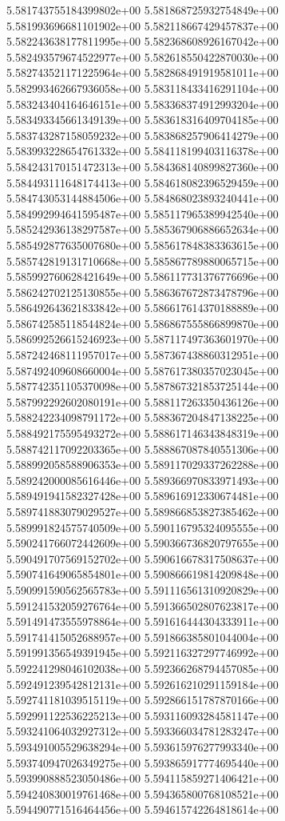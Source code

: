 5.581743755184399802e+00
5.581868725932754849e+00
5.581993696681101902e+00
5.582118667429457837e+00
5.582243638177811995e+00
5.582368608926167042e+00
5.582493579674522977e+00
5.582618550422870030e+00
5.582743521171225964e+00
5.582868491919581011e+00
5.582993462667936058e+00
5.583118433416291104e+00
5.583243404164646151e+00
5.583368374912993204e+00
5.583493345661349139e+00
5.583618316409704185e+00
5.583743287158059232e+00
5.583868257906414279e+00
5.583993228654761332e+00
5.584118199403116378e+00
5.584243170151472313e+00
5.584368140899827360e+00
5.584493111648174413e+00
5.584618082396529459e+00
5.584743053144884506e+00
5.584868023893240441e+00
5.584992994641595487e+00
5.585117965389942540e+00
5.585242936138297587e+00
5.585367906886652634e+00
5.585492877635007680e+00
5.585617848383363615e+00
5.585742819131710668e+00
5.585867789880065715e+00
5.585992760628421649e+00
5.586117731376776696e+00
5.586242702125130855e+00
5.586367672873478796e+00
5.586492643621833842e+00
5.586617614370188889e+00
5.586742585118544824e+00
5.586867555866899870e+00
5.586992526615246923e+00
5.587117497363601970e+00
5.587242468111957017e+00
5.587367438860312951e+00
5.587492409608660004e+00
5.587617380357023045e+00
5.587742351105370098e+00
5.587867321853725144e+00
5.587992292602080191e+00
5.588117263350436126e+00
5.588242234098791172e+00
5.588367204847138225e+00
5.588492175595493272e+00
5.588617146343848319e+00
5.588742117092203365e+00
5.588867087840551306e+00
5.588992058588906353e+00
5.589117029337262288e+00
5.589242000085616446e+00
5.589366970833971493e+00
5.589491941582327428e+00
5.589616912330674481e+00
5.589741883079029527e+00
5.589866853827385462e+00
5.589991824575740509e+00
5.590116795324095555e+00
5.590241766072442609e+00
5.590366736820797655e+00
5.590491707569152702e+00
5.590616678317508637e+00
5.590741649065854801e+00
5.590866619814209848e+00
5.590991590562565783e+00
5.591116561310920829e+00
5.591241532059276764e+00
5.591366502807623817e+00
5.591491473555978864e+00
5.591616444304333911e+00
5.591741415052688957e+00
5.591866385801044004e+00
5.591991356549391945e+00
5.592116327297746992e+00
5.592241298046102038e+00
5.592366268794457085e+00
5.592491239542812131e+00
5.592616210291159184e+00
5.592741181039515119e+00
5.592866151787870166e+00
5.592991122536225213e+00
5.593116093284581147e+00
5.593241064032927312e+00
5.593366034781283247e+00
5.593491005529638294e+00
5.593615976277993340e+00
5.593740947026349275e+00
5.593865917774695440e+00
5.593990888523050486e+00
5.594115859271406421e+00
5.594240830019761468e+00
5.594365800768108521e+00
5.594490771516464456e+00
5.594615742264818614e+00
